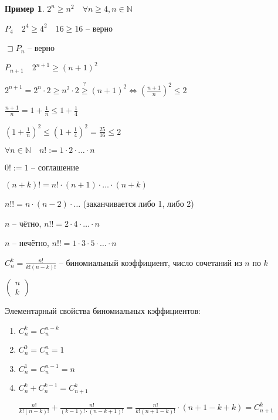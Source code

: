 \documentclass{book}
\newcommand\N{\ensuremath{\mathbb{N}}}
\theoremstyle{definition}
\newtheorem*{example}{Пример}
\begin{document}
       \begin{example}
           $2^n\geqslant n^2\quad \forall n\geqslant 4, n\in \N $

           $P_4\quad 2^4\geqslant 4^2\quad 16\geqslant 16$ -- верно

           $\sqsupset P_n$ -- верно

           $P_{n+1}\quad 2^{n+1}\geqslant (n+1)^2$

           $2^{n+1} = 2^n\cdot 2 \geqslant  n^2\cdot 2 \overset{?}{\geqslant} (n+1)^2 \iff \left( \frac{n+1}{n} \right)^2 \leqslant 2  $

           $\frac{n+1}{n} = 1+\frac{1}{n}\leqslant 1+\frac{1}{4}$

           $\left( 1+\frac{1}{n} \right) ^2 \leqslant \left( 1+\frac{1}{4} \right) ^2 = \frac{25}{16}\leqslant 2$
       \end{example}


       \begin{definition}
           $\forall n\in \N \quad n! := 1\cdot 2\cdot \ldots\cdot n$

           $0! := 1$ -- соглашение

           $(n+k)! = n!\cdot (n+1) \cdot  \ldots \cdot  (n+k)$

           $n!! = n\cdot (n-2) \cdot  \ldots$ (заканчивается либо 1, либо 2)

           $n$ -- чётно, $n!! = 2\cdot 4\cdot \ldots\cdot n$

           $n$ -- нечётно, $n!! = 1\cdot 3\cdot 5\cdot \ldots\cdot n$
       \end{definition}

       \begin{definition}

           $C_n^k = \frac{n!}{k!(n-k)!}$ -- биномиальный коэффициент, число сочетаний из $n$ по $k$

           $\begin{pmatrix} n\\k \end{pmatrix} $
       \end{definition}
       Элементарный свойства биномиальных кэффициентов:
       \begin{enumerate}
           \item $C_n^k = C_n^{n-k}$
           \item $C_n^0 = C_n^n = 1$
           \item $C_n^1 = C_n^{n-1} = n$
           \item $C_n^k + C_n^{k-1} = C_{n+1}^k$

               $\frac{n!}{k!(n-k)!} + \frac{n!}{(k-1)!\cdot (n-k+1)!} = \frac{n!}{k!(n+1-k)!} \cdot  (n+1-k+k) = C_{n+1}^k$ 
       \end{enumerate}
\end{document}
